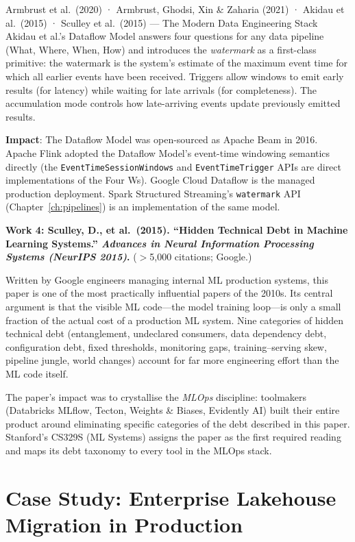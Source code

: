 \begin{researchspotlight}{Armbrust et al.\ (2020) · Armbrust, Ghodsi, Xin
  \& Zaharia (2021) · Akidau et al.\ (2015) · Sculley et al.\ (2015) ---
  The Modern Data Engineering Stack}
Akidau et al.'s Dataflow Model answers four questions for any data pipeline
(What, Where, When, How) and introduces the \emph{watermark} as a
first-class primitive: the watermark is the system's estimate of the
maximum event time for which all earlier events have been received.
Triggers allow windows to emit early results (for latency) while
waiting for late arrivals (for completeness). The accumulation mode
controls how late-arriving events update previously emitted results.

\textbf{Impact}: The Dataflow Model was open-sourced as Apache Beam in
2016. Apache Flink adopted the Dataflow Model's event-time windowing
semantics directly (the \texttt{EventTimeSessionWindows} and
\texttt{EventTimeTrigger} APIs are direct implementations of the Four
Ws). Google Cloud Dataflow is the managed production deployment.
Spark Structured Streaming's \texttt{watermark} API
(Chapter~\ref{ch:pipelines}) is an implementation of the same model.

\medskip
\textbf{Work 4: Sculley, D., et al.\ (2015). ``Hidden Technical Debt in
Machine Learning Systems.'' \textit{Advances in Neural Information
Processing Systems (NeurIPS 2015)}.} ($>$5{,}000 citations; Google.)

Written by Google engineers managing internal ML production systems,
this paper is one of the most practically influential papers of the
2010s. Its central argument is that the visible ML code---the model
training loop---is only a small fraction of the actual cost of a
production ML system. Nine categories of hidden technical debt
(entanglement, undeclared consumers, data dependency debt, configuration
debt, fixed thresholds, monitoring gaps, training--serving skew,
pipeline jungle, world changes) account for far more engineering
effort than the ML code itself.

The paper's impact was to crystallise the \emph{MLOps} discipline:
toolmakers (Databricks MLflow, Tecton, Weights \& Biases, Evidently AI)
built their entire product around eliminating specific categories of
the debt described in this paper. Stanford's CS329S (ML Systems) assigns
the paper as the first required reading and maps its debt taxonomy to
every tool in the MLOps stack.
\end{researchspotlight}

\section{Case Study: Enterprise Lakehouse Migration in Production}
\label{sec:lakehouse-case}

